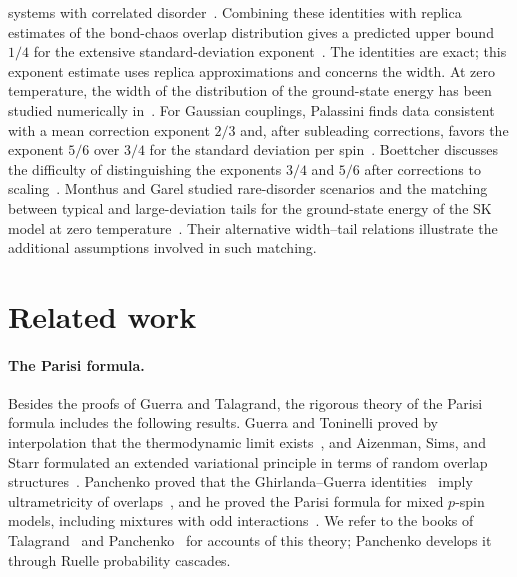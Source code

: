 systems with correlated disorder~\cite[Eqs.~(14) and~(31)]{Aspelmeier2008Exact}.
Combining these identities with replica estimates of the bond-chaos
overlap distribution gives a predicted upper bound $1/4$ for the
extensive standard-deviation exponent~\cite[Section~4.3]{Aspelmeier2008Exact,Aspelmeier2008Bond}.
The identities are exact; this exponent estimate uses replica
approximations and concerns the width.
At zero temperature,
the width of the distribution of the ground-state energy has been
studied numerically in~\cite{Boettcher2005,Palassini2008,Boettcher2010Fluctuations}.
For Gaussian couplings, Palassini finds data consistent with a mean
correction exponent $2/3$ and, after subleading corrections, favors the
exponent $5/6$ over
$3/4$ for the standard deviation per spin~\cite[Sections~3--4 and~6]{Palassini2008}.
Boettcher discusses the difficulty of distinguishing the exponents
$3/4$ and $5/6$ after corrections to
scaling~\cite[Section~IV]{Boettcher2010Fluctuations}.
Monthus and Garel studied rare-disorder scenarios and the matching
between typical and large-deviation tails for the ground-state energy of the SK model at zero
temperature~\cite[Section~III C--F]{MonthusGarel2010}.
Their alternative width--tail relations illustrate the additional
assumptions involved in such matching.

\section{Related work}\label{sec:intro-related}

\paragraph{The Parisi formula.}
Besides the proofs of Guerra and Talagrand, the rigorous theory of the
Parisi formula includes the following results. Guerra and Toninelli
proved by interpolation that the thermodynamic limit
exists~\cite{GuerraToninelli2002}, and Aizenman, Sims, and Starr
formulated an extended variational principle in terms of random overlap
structures~\cite{AizenmanSimsStarr2003}. Panchenko proved that the
Ghirlanda--Guerra identities~\cite{GhirlandaGuerra1998} imply ultrametricity of
overlaps~\cite[Theorem~1]{Panchenko2013Ultrametricity}, and he proved
the Parisi formula for mixed $p$-spin models, including mixtures with
odd interactions~\cite{Panchenko2014Parisi}. We refer to the books of
Talagrand~\cite{TalagrandVolI2011,TalagrandVolII2011} and
Panchenko~\cite{Panchenko2013Book} for accounts of this theory;
Panchenko develops it through Ruelle probability cascades.


